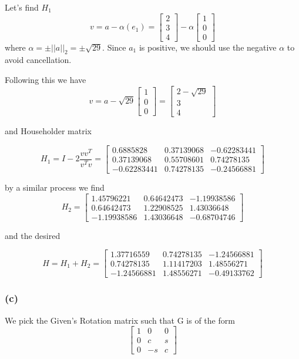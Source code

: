 \documentclass[12pt,a4paper]{report}
\begin{document}
Let's find $H_1$
$$
v = a - \alpha (e_1) =
\begin{bmatrix}
2\\
3\\
4
\end{bmatrix}
- \alpha
\begin{bmatrix}
1\\
0\\
0
\end{bmatrix}
$$
where $\alpha = \pm \lvert \lvert a \rvert \rvert_2 = \pm \sqrt{29}$. Since $a_1$ is positive, we should use the negative $\alpha$ to avoid cancellation.


Following this we have
$$
v = a - \sqrt{29}
\begin{bmatrix}
1\\
0\\
0
\end{bmatrix}
=
\begin{bmatrix}
2 - \sqrt{29}\\
3\\
4
\end{bmatrix}
$$

and Householder matrix

$$H_1 = I - 2\frac{vv^T}{v^Tv} = 
\begin{bmatrix}
0.6885828  & 0.37139068& -0.62283441\\
0.37139068 & 0.55708601 & 0.74278135\\
-0.62283441 & 0.74278135& -0.24566881
\end{bmatrix}
$$

by a similar process we find 
$$
H_2 =
\begin{bmatrix}
  1.45796221 & 0.64642473&-1.19938586\\
 0.64642473 & 1.22908525 & 1.43036648\\
-1.19938586 & 1.43036648 &-0.68704746
\end{bmatrix}
$$

and the desired 

{\color{blue}
$$H = H_1 + H_2 = 
\begin{bmatrix}
 1.37716559  &0.74278135& -1.24566881\\
  0.74278135  &1.11417203 & 1.48556271\\
 -1.24566881  &1.48556271 &-0.49133762
\end{bmatrix}
$$
}
\subsubsection{(c)}
We pick the Given's Rotation matrix such that G is of the form
$$
\begin{bmatrix}
1 & 0 & 0\\
0 & c & s\\
0 & -s & c
\end{bmatrix}
$$
\end{document}
